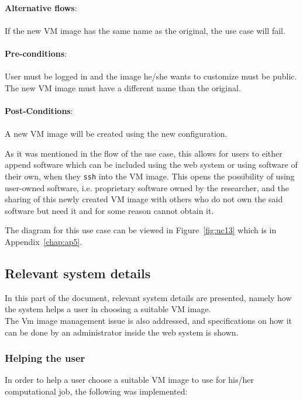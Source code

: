 \ \\
\textbf{Alternative flows}:\\
\ \\
If the new VM image has the same name as the original, the use case will fail.\\
\ \\
\textbf{Pre-conditions}:\\
\ \\
User must be logged in and the image he/she wants to customize must be public. The new VM image must have a different name than the original.\\
\ \\
\textbf{Post-Conditions}:\\
\ \\
A new VM image will be created using the new configuration.

As it was mentioned in the flow of the use case, this allows for users to either append software which can be included using the web system or using software of their own, when they \texttt{ssh} into the VM image. This opens the possibility of using user-owned software, i.e. proprietary software owned by the researcher, and the sharing of this newly created VM image with others who do not own the said software but need it and for some reason cannot obtain it.

The diagram for this use case can be viewed in Figure~\ref{fig:uc13} which is in Appendix~\ref{chap:ap5}.

\subsection{Relevant system details}%

In this part of the document, relevant system details are presented, namely how the system helps a user in choosing a suitable VM image.\ \\
The Vm image management issue is also addressed, and specifications on how it can be done by an administrator inside the web system is shown.

\subsubsection{Helping the user}\label{subsubsec:help}


In order to help a user choose a suitable VM image to use for his/her computational job, the following was implemented:

